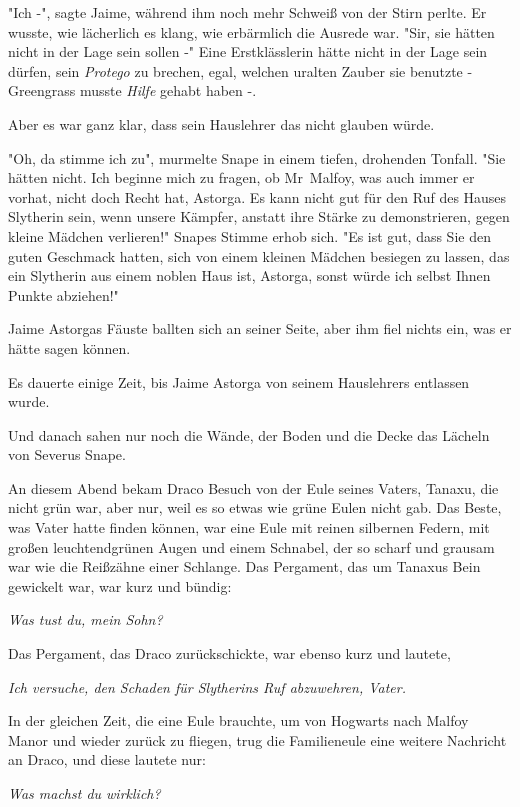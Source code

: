 {"Ich -", sagte Jaime, während ihm noch mehr Schweiß von der Stirn perlte. Er wusste, wie lächerlich es klang, wie erbärmlich die Ausrede war. "Sir, sie hätten nicht in der Lage sein sollen -" Eine Erstklässlerin hätte nicht in der Lage sein dürfen, sein \emph{Protego} zu brechen, egal, welchen uralten Zauber sie benutzte - Greengrass musste \emph{Hilfe} gehabt haben -.

Aber es war ganz klar, dass sein Hauslehrer das nicht glauben würde.

"Oh, da stimme ich zu", murmelte Snape in einem tiefen, drohenden Tonfall. "Sie hätten nicht. Ich beginne mich zu fragen, ob Mr~Malfoy, was auch immer er vorhat, nicht doch Recht hat, Astorga. Es kann nicht gut für den Ruf des Hauses Slytherin sein, wenn unsere Kämpfer, anstatt ihre Stärke zu demonstrieren, gegen kleine Mädchen verlieren!" Snapes Stimme erhob sich. "Es ist gut, dass Sie den guten Geschmack hatten, sich von einem kleinen Mädchen besiegen zu lassen, das ein Slytherin aus einem noblen Haus ist, Astorga, sonst würde ich selbst Ihnen Punkte abziehen!"

Jaime Astorgas Fäuste ballten sich an seiner Seite, aber ihm fiel nichts ein, was er hätte sagen können.

Es dauerte einige Zeit, bis Jaime Astorga von seinem Hauslehrers entlassen wurde.

Und danach sahen nur noch die Wände, der Boden und die Decke das Lächeln von Severus Snape.

An diesem Abend bekam Draco Besuch von der Eule seines Vaters, Tanaxu, die nicht grün war, aber nur, weil es so etwas wie grüne Eulen nicht gab. Das Beste, was Vater hatte finden können, war eine Eule mit reinen silbernen Federn, mit großen leuchtendgrünen Augen und einem Schnabel, der so scharf und grausam war wie die Reißzähne einer Schlange. Das Pergament, das um Tanaxus Bein gewickelt war, war kurz und bündig:

\emph{Was tust du, mein Sohn?}

Das Pergament, das Draco zurückschickte, war ebenso kurz und lautete,

\emph{\emph{Ich versuche, den Schaden für Slytherins Ruf} \emph{abzuwehren, Vater.}}

In der gleichen Zeit, die eine Eule brauchte, um von Hogwarts nach Malfoy Manor und wieder zurück zu fliegen, trug die Familieneule eine weitere Nachricht an Draco, und diese lautete nur:

\emph{Was machst du wirklich?}

}
